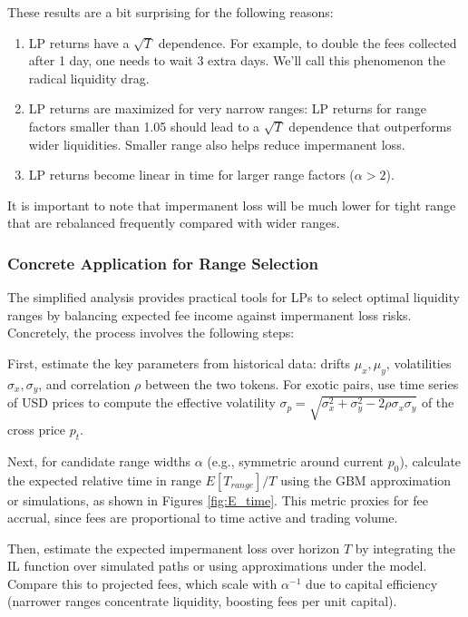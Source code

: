 \documentclass{article}
\begin{document}
These results are a bit surprising for the following reasons:
\begin{enumerate}
    \item LP returns have a $\sqrt{T}$ dependence. For example, to double the fees collected after 1 day, one needs to wait 3 extra days. We’ll call this phenomenon the radical liquidity drag.
    \item LP returns are maximized for very narrow ranges: LP returns for range factors smaller than 1.05 should lead to a $\sqrt{T}$ dependence that outperforms wider liquidities. Smaller range also helps reduce impermanent loss.
    \item LP returns become linear in time for larger range factors ($\alpha>2$).
\end{enumerate}

It is important to note that impermanent loss will be much lower for tight range that are rebalanced frequently compared with wider ranges.

\subsubsection{Concrete Application for Range Selection}

The simplified analysis provides practical tools for LPs to select optimal liquidity ranges by balancing expected fee income against impermanent loss risks. Concretely, the process involves the following steps:

First, estimate the key parameters from historical data: drifts \(\mu_x, \mu_y\), volatilities \(\sigma_x, \sigma_y\), and correlation \(\rho\) between the two tokens. For exotic pairs, use time series of USD prices to compute the effective volatility \(\sigma_p = \sqrt{\sigma_x^2 + \sigma_y^2 - 2\rho\sigma_x\sigma_y}\) of the cross price \(p_t\).

Next, for candidate range widths \(\alpha\) (e.g., symmetric around current \(p_0\)), calculate the expected relative time in range \(E[T_{range}]/T\) using the GBM approximation or simulations, as shown in Figures \ref{fig:E_time}. This metric proxies for fee accrual, since fees are proportional to time active and trading volume.

Then, estimate the expected impermanent loss over horizon \(T\) by integrating the IL function over simulated paths or using approximations under the model. Compare this to projected fees, which scale with \(\alpha^{-1}\) due to capital efficiency (narrower ranges concentrate liquidity, boosting fees per unit capital).
\end{document}
